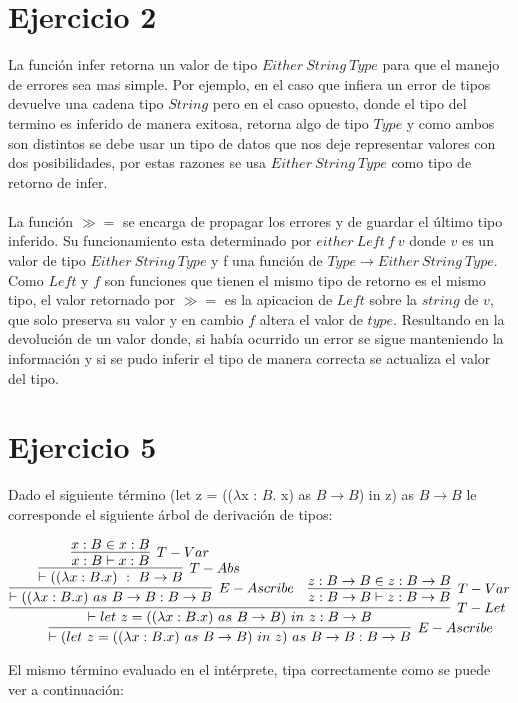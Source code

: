 \documentclass[a4paper,12pt]{article}
\begin{document}
\section*{Ejercicio 2}

La función infer retorna un valor de tipo $ Either \ String \ Type $ para que
el manejo de errores sea mas simple. Por ejemplo, en el caso que infiera un error de tipos devuelve 
 una cadena tipo $String$ pero en el caso opuesto, donde el tipo del termino es inferido de 
manera exitosa, retorna algo de tipo $Type$ y como ambos son distintos se debe usar un tipo de
datos que nos deje representar valores con dos posibilidades, por estas razones se usa 
$ Either \ String \ Type $ como tipo de retorno de infer. \\ \\
La función $\gg=$ se encarga de propagar los errores y de guardar el último tipo inferido. Su 
funcionamiento esta determinado por $either \ Left \ f \ v$ donde $v$ es un valor de tipo 
$ Either \ String \ Type $ y f una función de $Type\to Either\ String\ Type$.
Como $Left$ y $f$ son funciones que tienen el mismo tipo de
retorno es el mismo tipo, el valor retornado por $\gg=$ es la apicacion de $Left$ sobre la 
$string$ de $v$, que solo preserva su valor y  en cambio $f$ altera el valor de $type$. 
Resultando en la devolución de un valor donde, si había ocurrido un error se sigue manteniendo
la información y si se pudo inferir el tipo de manera correcta se actualiza el valor del tipo.



\section*{Ejercicio 5}

Dado el siguiente término  (let z = (($\lambda$x : $B$. x) as $B \to B$) in z) as $B \to B$ le
corresponde el siguiente árbol de derivación de tipos:

$$
\vcenter {
\infer[E-Ascribe] {\vdash (let\ z = ((\lambda x : B. x)\ as\ B \to B)\ in\ z)\ as\ B \to B : B\to B} {
  \infer[T-Let] {\vdash let\ z = ((\lambda x : B. x)\ as\ B \to B)\ in\ z: B \to B} {     
    \infer[E-Ascribe] {\vdash  ((\lambda x : B. x)\ as\ B \to B : B\to B} {
      \infer[T-Abs] {\vdash ((\lambda x : B. x)\ : \ B \to B} {
        \infer[T-Var] {x:B \vdash x:B} {x:B \in x:B}
        }
      }
    & 
    \infer[T-Var] {z:B\to B \vdash z:B\to B} {z:B\to B \in z:B\to B}
    }
  } 
}
$$

El mismo término evaluado en el intérprete, tipa correctamente como se puede ver a continuación:
\end{document}
